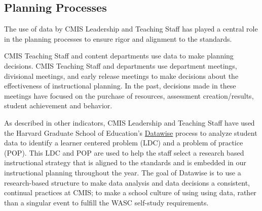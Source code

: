 \documentclass{report}
\begin{document}
\subsection{Planning Processes}



\begin{findings}
The use of data by CMIS Leadership and Teaching Staff has played a central role in the planning processes to ensure rigor and alignment to the standards. 


CMIS Teaching Staff and content departments use data to make planning decisions. CMIS Teaching Staff and departments use department meetings, divisional meetings, and early release meetings to make decisions about the effectiveness of instructional planning. In the past, decisions made in these meetings have focused on the purchase of resources, assessment creation/results, student achievement and behavior. 

As described in other indicators, CMIS Leadership and Teaching Staff have used the Harvard Graduate School of Education’s \href{https://docs.google.com/a/cmis.ac.th/presentation/d/1omzyjfwf5fazGCSuvw7dDQn4eqhpOIaldeLXY7-6PYQ/edit?usp=sharing}{Datawise} process to analyze student data to identify a learner centered problem (LDC) and a problem of practice (POP). This LDC and POP are used to help the staff select a research based instructional strategy that is aligned to the standards and is embedded in our instructional planning  throughout the year. The goal of Datawise is to use a research-based structure to make data analysis and data decisions a consistent, continual practices at CMIS; to make a school culture of using using data, rather than a singular event to fulfill the WASC self-study requirements. 



\end{findings}
\end{document}
